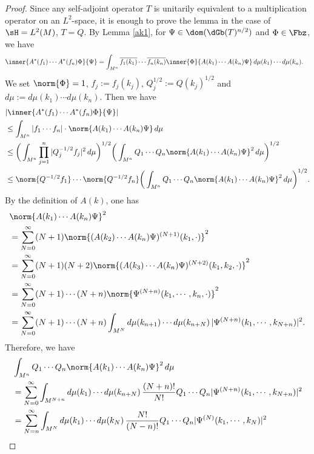 \documentclass[12pt]{article}
\theoremstyle{plain}
\numberwithin{equation}{section}
\theoremstyle{remark}
\begin{document}
\begin{proof}
Since any self-adjoint operator $T$ is unitarily equivalent to a multiplication operator on an $L^2$-space,
it is enough to prove the lemma in the case of $\sH=L^2(M)$, $T=Q$.
By Lemma \ref{ak1}, for $\Psi\in\dom(\dGb(T)^{n/2})$ and $\Phi\in\Fbz$, we have
\begin{align*}
 \inner{A^*(f_1)\cdots A^*(f_n)\Phi}{\Psi}
& =  \int_{M^n}  \overline{f_1(k_1)}\cdots \overline{f_n(k_n)} \inner{\Phi}{A(k_1)\cdots A(k_n)\Psi}\,d\mu(k_1)\cdots d\mu(k_n).
\end{align*}
We set $\norm{\Phi}=1$, $f_j:=f_j(k_j)$, $Q_j^{1/2}:=Q(k_j)^{1/2}$ and $d\mu:=d\mu(k_1)\cdots d\mu(k_n)$.  
Then we have
\begin{align*}
& |\inner{A^*(f_1)\cdots A^*(f_n)\Phi}{\Psi}| \\
& \leq  \int_{M^n}  |f_1 \cdots f_n|  \cdot \norm{A(k_1)\cdots A(k_n)\Psi}\,d\mu \\
& \leq  \bigg( \int_{M^n}  \prod_{j=1}^n |Q_j^{-1/2}f_j|^2\,d\mu \bigg)^{1/2}  
  \bigg( \int_{M^n} Q_1\cdots Q_n \norm{A(k_1)\cdots A(k_n)\Psi}^2\,d\mu \bigg)^{1/2} \\
& \leq  \norm{Q^{-1/2}f_1} \cdots \norm{Q^{-1/2}f_n}
  \bigg( \int_{M^n} Q_1\cdots Q_n \norm{A(k_1)\cdots A(k_n)\Psi}^2\,d\mu \bigg)^{1/2}.
\end{align*}
By the definition of $A(k)$, one has
\begin{align*}
&  \norm{A(k_1)\cdots A(k_n)\Psi}^2 \\
& = \sum_{N=0}^\infty (N+1)\norm{(A(k_2)\cdots A(k_n)\Psi)^{(N+1)}(k_1,\cdot)}^2 \\
& = \sum_{N=0}^\infty (N+1)(N+2)\norm{(A(k_3)\cdots A(k_n)\Psi)^{(N+2)}(k_1,k_2,\cdot)}^2 \\
& = \sum_{N=0}^\infty (N+1)\cdots (N+n) \norm{\Psi^{(N+n)}(k_1,\cdots,k_n,\cdot)}^2 \\
& = \sum_{N=0}^\infty (N+1)\cdots (N+n) \int_{M^N} d\mu(k_{n+1})\cdots d\mu(k_{n+N})\,|\Psi^{(N+n)}(k_1,\cdots,k_{N+n})|^2.
\end{align*}
Therefore, we have
\begin{align}
&\int_{M^n} Q_1\cdots Q_n \norm{A(k_1)\cdots A(k_n)\Psi}^2\,d\mu  \notag \\
&= \sum_{N=0}^\infty  \int_{M^{N+n}} d\mu(k_1)\cdots d\mu(k_{n+N})\,\frac{(N+n)!}{N!} Q_1\cdots Q_n| \Psi^{(N+n)}(k_1,\cdots,k_{N+n})|^2 \notag \\
&= \sum_{N=n}^\infty  \int_{M^N} d\mu(k_1)\cdots d\mu(k_N)\,\frac{N!}{(N-n)!} Q_1\cdots Q_n| \Psi^{(N)}(k_1,\cdots,k_N)|^2 \notag \\

\end{align}
\end{proof}
\end{document}
